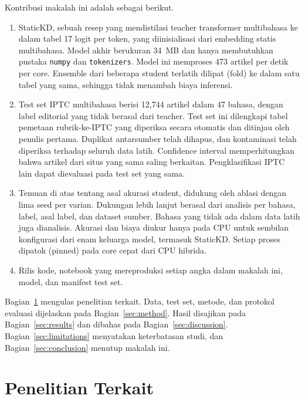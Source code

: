 \documentclass[journal]{IEEEtran}
\begin{document}
Kontribusi makalah ini adalah sebagai berikut.
\begin{enumerate}
  \item StaticKD, sebuah resep yang mendistilasi teacher transformer multibahasa ke dalam tabel 17 logit per token, yang diinisialisasi dari embedding statis multibahasa. Model akhir berukuran 34~MB dan hanya membutuhkan pustaka \texttt{numpy} dan \texttt{tokenizers}. Model ini memproses 473 artikel per detik per core. Ensemble dari beberapa student terlatih dilipat (fold) ke dalam satu tabel yang sama, sehingga tidak menambah biaya inferensi.
  \item Test set IPTC multibahasa berisi 12,744 artikel dalam 47 bahasa, dengan label editorial yang tidak berasal dari teacher. Test set ini dilengkapi tabel pemetaan rubrik-ke-IPTC yang diperiksa secara otomatis dan ditinjau oleh penulis pertama. Duplikat antarsumber telah dihapus, dan kontaminasi telah diperiksa terhadap seluruh data latih. Confidence interval memperhitungkan bahwa artikel dari situs yang sama saling berkaitan. Pengklasifikasi IPTC lain dapat dievaluasi pada test set yang sama.
  \item Temuan di atas tentang asal akurasi student, didukung oleh ablasi dengan lima seed per varian. Dukungan lebih lanjut berasal dari analisis per bahasa, label, asal label, dan dataset sumber. Bahasa yang tidak ada dalam data latih juga dianalisis. Akurasi dan biaya diukur hanya pada CPU untuk sembilan konfigurasi dari enam keluarga model, termasuk StaticKD. Setiap proses dipatok (pinned) pada core cepat dari CPU hibrida.
  \item Rilis kode, notebook yang mereproduksi setiap angka dalam makalah ini, model, dan manifest test set.
\end{enumerate}

Bagian~\ref{sec:related} mengulas penelitian terkait. Data, test set, metode, dan protokol evaluasi dijelaskan pada Bagian~\ref{sec:method}. Hasil disajikan pada Bagian~\ref{sec:results} dan dibahas pada Bagian~\ref{sec:discussion}. Bagian~\ref{sec:limitations} menyatakan keterbatasan studi, dan Bagian~\ref{sec:conclusion} menutup makalah ini.

\section{Penelitian Terkait}
\label{sec:related}
\end{document}
